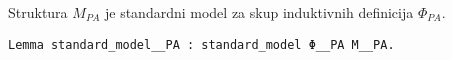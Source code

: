 \begin{proposition}
  Struktura \(M_{\mathit{PA}}\) je standardni model za skup induktivnih definicija \(\Phi_{\mathit{PA}}\).
\begin{verbatim}
Lemma standard_model__PA : standard_model Φ__PA M__PA.
\end{verbatim}
\end{proposition}


